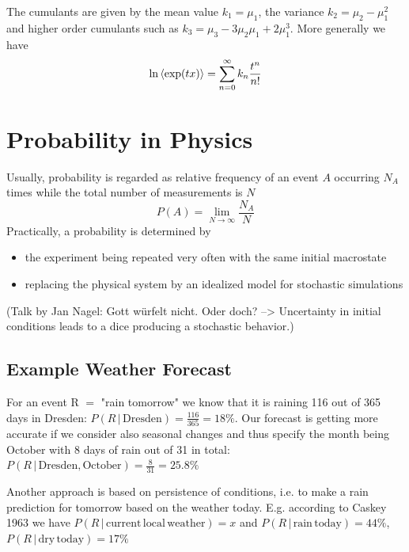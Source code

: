\documentclass{notebook}
\begin{document}
\begin{theorem}[Cumulants]
	The cumulants are given by the mean value $k_1 = \mu_1$, the variance $k_2 = \mu_2 - \mu^2_1$ and higher order cumulants such as $ k_3 = \mu_3 - 3 \mu_2 \mu_1 + 2 \mu_1^3$. More generally we have
	\begin{equation}
	\ln \expval{\exp(t x)} = \sum^{\infty}_{n = 0}{k_n \frac{t^n}{n!}}
	\end{equation}
\end{theorem}


\section{Probability in Physics}

Usually, probability is regarded as relative frequency of an event $A$ occurring $N_A$ times while the total number of measurements is $N$
%
\begin{equation}
P(A) = \lim_{N \to \infty}{\frac{N_A}{N}}
\end{equation}
%
Practically, a probability is determined by
%
\begin{itemize}
	\item{the experiment being repeated very often with the same initial macrostate}
	\item{replacing the physical system by an idealized model for stochastic simulations}
\end{itemize}
%
(Talk by Jan Nagel: Gott würfelt nicht. Oder doch? --> Uncertainty in initial conditions leads to a dice producing a stochastic behavior.)

\subsection*{Example Weather Forecast}

For an event R $=$ "rain tomorrow" we know that it is raining 116 out of 365 days in Dresden: $P(R \, | \, \mathrm{Dresden}) = \frac{116}{365} = 18 \%$. Our forecast is getting more accurate if we consider also seasonal changes and thus specify the month being October with 8 days of rain out of 31 in total: $P(R \, | \, \mathrm{Dresden, October}) = \frac{8}{31} = 25.8 \%$

Another approach is based on persistence of conditions, i.e. to make a rain prediction for tomorrow based on the weather today. E.g. according to Caskey 1963 we have $P(R \, | \, \mathrm{current \, local \, weather}) = x$ and $P(R \, | \, \mathrm{rain \, today}) = 44 \%$, $P(R \, | \, \mathrm{dry \, today}) = 17 \%$
\end{document}
